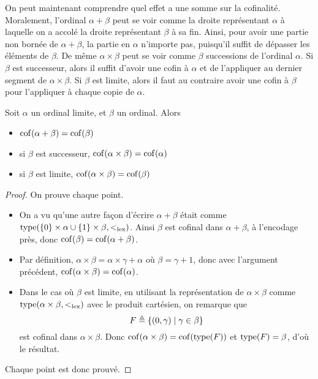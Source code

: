 On peut maintenant comprendre quel effet a une somme sur la cofinalité.
Moralement, l'ordinal $\alpha + \beta$ peut se voir comme la droite représentant
$\alpha$ à laquelle on a accolé la droite représentant $\beta$ à sa fin. Ainsi,
pour avoir une partie non bornée de $\alpha + \beta$, la partie en $\alpha$
n'importe pas, puisqu'il suffit de dépasser les éléments de $\beta$. De même
$\alpha \times \beta$ peut se voir comme $\beta$ successions de l'ordinal
$\alpha$. Si $\beta$ est successeur, alors il suffit d'avoir une cofin à
$\alpha$ et de l'appliquer au dernier segment de $\alpha\times\beta$. Si
$\beta$ est limite, alors il faut au contraire avoir une cofin à $\beta$ pour
l'appliquer à chaque copie de $\alpha$.

\begin{proposition}
  Soit $\alpha$ un ordinal limite, et $\beta$ un ordinal. Alors
  \begin{itemize}
  \item $\operatorname{cof}(\alpha + \beta) = \operatorname{cof}(\beta)$
  \item si $\beta$ est successeur, $\operatorname{cof}(\alpha \times \beta) = \operatorname{cof}(\alpha)$
  \item si $\beta$ est limite, $\operatorname{cof}(\alpha\times\beta) = \operatorname{cof}(\beta)$
  \end{itemize}
\end{proposition}

\begin{proof}
  On prouve chaque point.
  \begin{itemize}
  \item On a vu qu'une autre façon d'écrire $\alpha + \beta$ était comme
    $\operatorname{type}(\{0\}\times\alpha \cup \{1\}\times\beta, <_{\mathrm{lex}})$. Ainsi $\beta$ est
    cofinal dans $\alpha + \beta$, à l'encodage près, donc
    $\operatorname{cof}(\beta) = \operatorname{cof}(\alpha + \beta)$.
  \item Par définition, $\alpha \times \beta = \alpha \times \gamma + \alpha$
    où $\beta = \gamma + 1$, donc avec l'argument précédent,
    $\operatorname{cof}(\alpha\times\beta) = \operatorname{cof}(\alpha)$.
  \item Dans le cas où $\beta$ est limite, en utilisant la représentation de
    $\alpha \times \beta$ comme $\operatorname{type}(\alpha\times\beta,<_{\mathrm{lex}})$ avec le produit
    cartésien, on remarque que
    \[F \triangleq \{(0,\gamma) \mid \gamma \in \beta\}\]
    est cofinal dans $\alpha \times \beta$. Donc
    $\operatorname{cof}(\alpha\times \beta) = \operatorname{cof}(\operatorname{type}(F))$ et $\operatorname{type}(F) = \beta$, d'où le
    résultat.
  \end{itemize}
  Chaque point est donc prouvé.
\end{proof}

